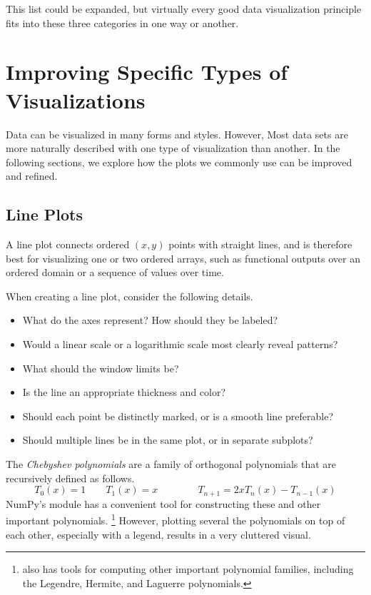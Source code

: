 This list could be expanded, but virtually every good data visualization principle fits into these three categories in one way or another.

\section*{Improving Specific Types of Visualizations} %

Data can be visualized in many forms and styles.
However, Most data sets are more naturally described with one type of visualization than another.
In the following sections, we explore how the plots we commonly use can be improved and refined.

\subsection*{Line Plots} %

A line plot connects ordered $(x,y)$ points with straight lines, and is therefore best for visualizing one or two ordered arrays, such as functional outputs over an ordered domain or a sequence of values over time.

\newpage

When creating a line plot, consider the following details.
%
\begin{itemize}
    \item What do the axes represent? How should they be labeled?
    \item Would a linear scale or a logarithmic scale most clearly reveal patterns?
    \item What should the window limits be?
    \item Is the line an appropriate thickness and color?
    \item Should each point be distinctly marked, or is a smooth line preferable?
    \item Should multiple lines be in the same plot, or in separate subplots?
\end{itemize}

The \emph{Chebyshev polynomials} are a family of orthogonal polynomials that are recursively defined as follows.
\[T_0(x) = 1 \qquad T_1(x) = x \qquad\qquad T_{n+1} = 2xT_n(x) - T_{n-1}(x)\]
NumPy's  module has a convenient tool for constructing these and other important polynomials.%
\footnote{ also has tools for computing other important polynomial families, including the Legendre, Hermite, and Laguerre polynomials.}
However, plotting several the polynomials on top of each other, especially with a legend, results in a very cluttered visual.

